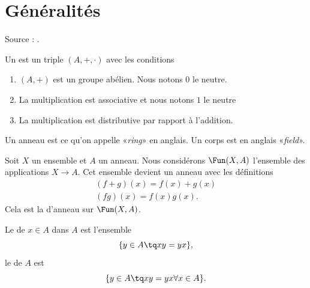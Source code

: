 
\section{Généralités}

Source : \cite{Tauvel}.

\begin{definition}
    Un  est un triple \( (A,+,\cdot)\) avec les conditions
    \begin{enumerate}
        \item
            \( (A,+)\) est un groupe abélien. Nous notons \( 0\) le neutre.
        \item
            La multiplication est associative et nous notons \( 1\) le neutre
        \item
            La multiplication est distributive par rapport à l'addition.
    \end{enumerate}
\end{definition}

\begin{remark}
    Un anneau est ce qu'on appelle «\emph{ring}» en anglais. Un corps est en anglais «\emph{field}».
\end{remark}

Soit \( X\) un ensemble et $A$ un anneau. Nous considérons \( \Fun(X,A)\) l'ensemble des applications \( X\to A\). Cet ensemble devient un anneau avec les définitions
\begin{subequations}
    \begin{align}
        (f+g)(x)=f(x)+g(x)\\
        (fg)(x)=f(x)g(x).
    \end{align}
\end{subequations}
Cela est la  d'anneau sur \( \Fun(X,A)\).

Le  de \( x\in A\) dans \( A\) est l'ensemble
\begin{equation}
    \{ y\in A\tq xy=yx \},
\end{equation}
le  de \( A\) est
\begin{equation}
    \{ y\in A\tq xy=yx\forall x\in A \}.
\end{equation}


